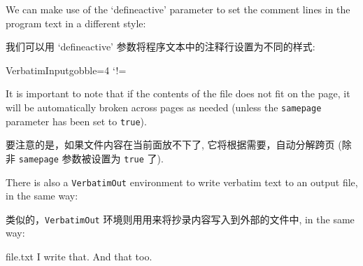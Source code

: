 \documentclass[twoside]{article}
\newcommand\verbatimTxt{抄录}
\begin{document}
  We can make use of the `defineactive' parameter to set the comment lines
  in the program text in a different style:
  
我们可以用 `defineactive' 参数将程序文本中的注释行设置为不同的样式:

\begin{SideBySideExample}
  \RecustomVerbatimCommand{\VerbatimInput}
  {VerbatimInput}{gobble=4}
  \def\ExclamationPoint{\char33}
  \catcode`!=\active
  \VerbatimInput%
    [defineactive=%
      \def!{\color{cyan}\itshape
        \ExclamationPoint}]
    {hello.f90}
\end{SideBySideExample}

  It is important to note that if the contents of the file does not fit on
the page, it will be automatically broken across pages as needed (unless the
\texttt{samepage} parameter has been set to \texttt{true}).

  要注意的是，如果文件内容在当前面放不下了, 它将根据需要，自动分解跨页 (除非 \texttt{samepage} 参数被设置为 \texttt{true} 了).

  There is also a \verb+VerbatimOut+ environment to write verbatim text to an
output file, in the same way:

  类似的，\verb+VerbatimOut+ 环境则用用来将{\verbatimTxt}内容写入到外部的文件中, in the same way:

\begin{SideBySideExample}
  \begin{VerbatimOut}{file.txt}
    I write that.
    And that too.
  \end{VerbatimOut}

\end{SideBySideExample}
\end{document}
